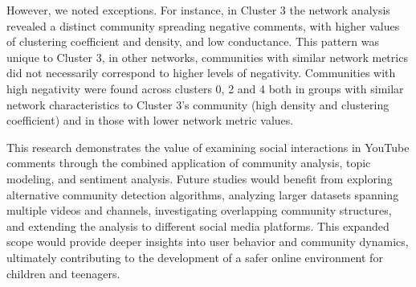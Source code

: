 \documentclass[12pt]{article}
\begin{document}
However, we noted exceptions. For instance, in Cluster 3 the network analysis revealed a distinct 
community spreading negative comments, with higher values of clustering coefficient and density, and low conductance.
This pattern was unique to Cluster 3, in other networks, communities with similar network metrics 
did not necessarily correspond to higher levels of negativity. 
Communities with high negativity were found across clusters 0, 2 and 4 both in groups with similar network 
characteristics to Cluster 3's community (high density and clustering coefficient) and in those with 
lower network metric values. 
    
This research demonstrates the value of examining social interactions in YouTube comments through the 
combined application of community analysis, topic modeling, and sentiment analysis. Future studies would benefit 
from exploring alternative community detection algorithms, analyzing larger datasets spanning 
multiple videos and channels, investigating overlapping community structures, and extending the analysis to 
different social media platforms. This expanded scope would provide deeper insights into 
user behavior and community dynamics, ultimately contributing to the development of a safer online 
environment for children and teenagers.



\end{document}
